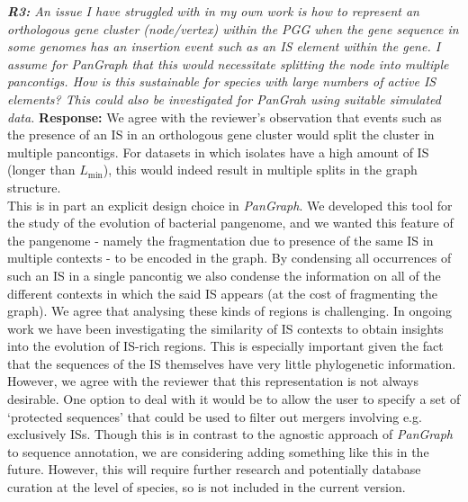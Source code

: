 \documentclass[aps,rmp,onecolumn]{revtex4-1}
\newcommand{\Lthr}{L_{\min}}
\newcommand{\Marco}[1]{{\color{orange}Marco: #1}}
\newcommand{\Liam}[1]{{\color{teal}Liam: #1}}
\newcommand{\reviewer}[2]{{\it \textbf{#1:} #2\vskip 5mm}}
\newcommand{\response}[1]{{{\color{response}\textbf{Response:} #1}}\vskip 5mm}
\begin{document}
\reviewer{R3}{An issue I have struggled with in my own work is how to represent an orthologous gene cluster (node/vertex) within the PGG when the gene sequence in some genomes has an insertion event such as an IS element within the gene. I assume for PanGraph that this would necessitate splitting the node into multiple pancontigs. How is this sustainable for species with large numbers of active IS elements? This could also be investigated for PanGrah using suitable simulated data.}
\response{
      We agree with the reviewer's observation that events such as the presence of an IS in an orthologous gene cluster would split the cluster in multiple pancontigs. 
      For datasets in which isolates have a high amount of IS (longer than $\Lthr$), this would indeed result in multiple splits in the graph structure.\\
      This is in part an explicit design choice in \textit{PanGraph}. We developed this tool for the study of the evolution of bacterial pangenome, and we wanted this feature of the pangenome - namely the fragmentation due to presence of the same IS in multiple contexts - to be encoded in the graph. 
      By condensing all occurrences of such an IS in a single pancontig we also condense the information on all of the different contexts in which the said IS appears (at the cost of fragmenting the graph). We agree that analysing these kinds of regions is challenging. In ongoing work we have been investigating the similarity of IS contexts to obtain insights into the evolution of IS-rich regions. This is especially important given the fact that the sequences of the IS themselves have very little phylogenetic information.\\
      However, we agree with the reviewer that this representation is not always desirable. One option to deal with it would be to allow the user to specify a set of `protected sequences' that could be used to filter out mergers involving e.g. exclusively ISs. Though this is in contrast to the agnostic approach of \textit{PanGraph} to sequence annotation, we are considering adding something like this in the future. However, this will require further research and potentially database curation at the level of species, so is not included in the current version.
}


{}
\end{document}
